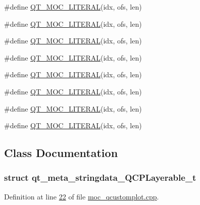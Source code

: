 \begin{DoxyCompactItemize}
\item 
\#define \hyperlink{a00016_a75bb9482d242cde0a06c9dbdc6b83abe}{Q\+T\+\_\+\+M\+O\+C\+\_\+\+L\+I\+T\+E\+R\+A\+L}(idx, ofs, len)
\item 
\#define \hyperlink{a00016_a75bb9482d242cde0a06c9dbdc6b83abe}{Q\+T\+\_\+\+M\+O\+C\+\_\+\+L\+I\+T\+E\+R\+A\+L}(idx, ofs, len)
\item 
\#define \hyperlink{a00016_a75bb9482d242cde0a06c9dbdc6b83abe}{Q\+T\+\_\+\+M\+O\+C\+\_\+\+L\+I\+T\+E\+R\+A\+L}(idx, ofs, len)
\item 
\#define \hyperlink{a00016_a75bb9482d242cde0a06c9dbdc6b83abe}{Q\+T\+\_\+\+M\+O\+C\+\_\+\+L\+I\+T\+E\+R\+A\+L}(idx, ofs, len)
\item 
\#define \hyperlink{a00016_a75bb9482d242cde0a06c9dbdc6b83abe}{Q\+T\+\_\+\+M\+O\+C\+\_\+\+L\+I\+T\+E\+R\+A\+L}(idx, ofs, len)
\item 
\#define \hyperlink{a00016_a75bb9482d242cde0a06c9dbdc6b83abe}{Q\+T\+\_\+\+M\+O\+C\+\_\+\+L\+I\+T\+E\+R\+A\+L}(idx, ofs, len)
\item 
\#define \hyperlink{a00016_a75bb9482d242cde0a06c9dbdc6b83abe}{Q\+T\+\_\+\+M\+O\+C\+\_\+\+L\+I\+T\+E\+R\+A\+L}(idx, ofs, len)
\item 
\#define \hyperlink{a00016_a75bb9482d242cde0a06c9dbdc6b83abe}{Q\+T\+\_\+\+M\+O\+C\+\_\+\+L\+I\+T\+E\+R\+A\+L}(idx, ofs, len)
\end{DoxyCompactItemize}


\subsection{Class Documentation}
\label{d8/d17/a00114}
\hypertarget{a00016_d8/d17/a00114}{}
\subsubsection{struct qt\+\_\+meta\+\_\+stringdata\+\_\+\+Q\+C\+P\+Layerable\+\_\+t}


Definition at line \hyperlink{a00016_source_l00022}{22} of file \hyperlink{a00016_source}{moc\+\_\+qcustomplot.\+cpp}.



